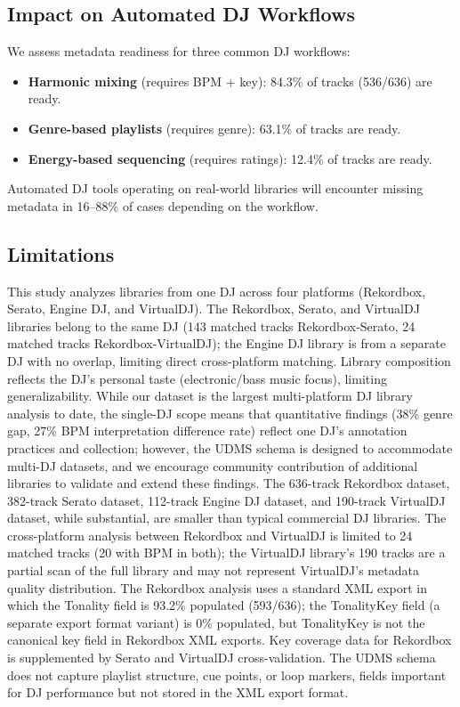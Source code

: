 \documentclass[letterpaper,10pt]{article}
\begin{document}
\subsection{Impact on Automated DJ Workflows}

We assess metadata readiness for three common DJ workflows:
\begin{itemize}
  \item \textbf{Harmonic mixing} (requires BPM + key): 84.3\% of tracks (536/636) are ready.
  \item \textbf{Genre-based playlists} (requires genre): 63.1\% of tracks are ready.
  \item \textbf{Energy-based sequencing} (requires ratings): 12.4\% of tracks are ready.
\end{itemize}
Automated DJ tools operating on real-world libraries will encounter missing metadata in 16--88\% of cases depending on the workflow.

\subsection{Limitations}

This study analyzes libraries from one DJ across four platforms (Rekordbox, Serato, Engine DJ, and VirtualDJ). The Rekordbox, Serato, and VirtualDJ libraries belong to the same DJ (143 matched tracks Rekordbox-Serato, 24 matched tracks Rekordbox-VirtualDJ); the Engine DJ library is from a separate DJ with no overlap, limiting direct cross-platform matching. Library composition reflects the DJ's personal taste (electronic/bass music focus), limiting generalizability. While our dataset is the largest multi-platform DJ library analysis to date, the single-DJ scope means that quantitative findings (38\% genre gap, 27\% BPM interpretation difference rate) reflect one DJ's annotation practices and collection; however, the UDMS schema is designed to accommodate multi-DJ datasets, and we encourage community contribution of additional libraries to validate and extend these findings. The 636-track Rekordbox dataset, 382-track Serato dataset, 112-track Engine DJ dataset, and 190-track VirtualDJ dataset, while substantial, are smaller than typical commercial DJ libraries. The cross-platform analysis between Rekordbox and VirtualDJ is limited to 24 matched tracks (20 with BPM in both); the VirtualDJ library's 190 tracks are a partial scan of the full library and may not represent VirtualDJ's metadata quality distribution. The Rekordbox analysis uses a standard XML export in which the Tonality field is 93.2\% populated (593/636); the TonalityKey field (a separate export format variant) is 0\% populated, but TonalityKey is not the canonical key field in Rekordbox XML exports. Key coverage data for Rekordbox is supplemented by Serato and VirtualDJ cross-validation. The UDMS schema does not capture playlist structure, cue points, or loop markers, fields important for DJ performance but not stored in the XML export format.
\end{document}
